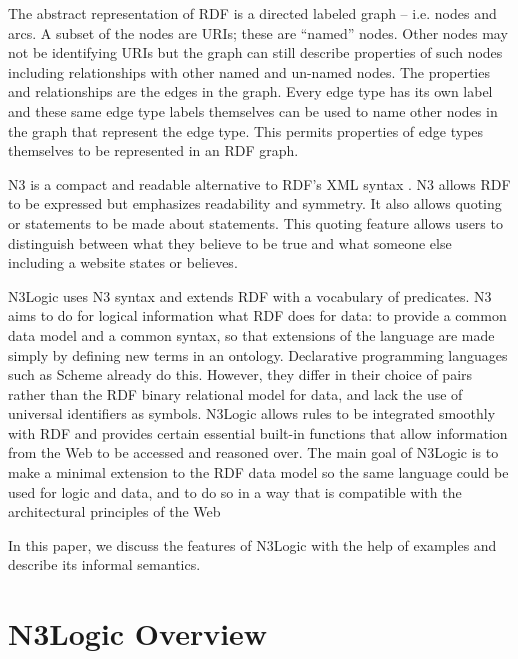 \documentclass{tlp}
\begin{document}
The abstract representation of RDF \cite{rdfc} is a directed labeled
graph -- i.e. nodes and arcs.  A subset of the nodes are URIs; these
are ``named'' nodes.  Other nodes may not be identifying URIs but the
graph can still describe properties of such nodes including
relationships with other named and un-named nodes.  The properties and
relationships are the edges in the graph.  Every edge type has its own
label and these same edge type labels themselves can be used to name
other nodes in the graph that represent the edge type.  This permits
properties of edge types themselves to be represented in an RDF graph.

N3 is a compact and readable alternative to RDF's XML syntax
\cite{bl01n3}. N3 allows RDF to be expressed but emphasizes
readability and symmetry. It also allows quoting or statements to be
made about statements. This quoting feature allows users to
distinguish between what they believe to be true and what someone else
including a website states or believes. 

N3Logic uses N3 syntax and extends RDF with a vocabulary of
predicates. N3 aims to do for logical information what RDF does for
data: to provide a common data model and a common syntax, so that
extensions of the language are made simply by defining new terms in an
ontology. Declarative programming languages such as Scheme
\cite{scheme} already do this.  However, they differ in their choice
of pairs rather than the RDF binary relational model for data, and
lack the use of universal identifiers as symbols.  N3Logic allows
rules to be integrated smoothly with RDF and provides certain
essential built-in functions that allow information from the Web to be
accessed and reasoned over. The main goal of N3Logic is to make a
minimal extension to the RDF data model so the same language could be
used for logic and data, and to do so in a way that is compatible with
the architectural principles of the Web

In this paper, we discuss the features of N3Logic with the help of
examples and describe its informal semantics.



\section{N3Logic Overview}
\end{document}
